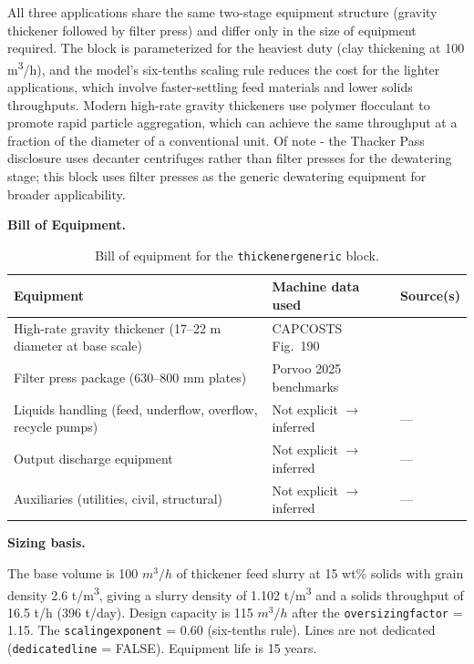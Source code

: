 \documentclass{article}
\renewcommand\_{\textunderscore\allowbreak}
\begin{document}
All three applications share the same two-stage equipment structure (gravity thickener followed by filter press) and differ only in the size of equipment required. The block is parameterized for the heaviest duty (clay thickening at 100 \si{m^3/h}), and the model's six-tenths scaling rule reduces the cost for the lighter applications, which involve faster-settling feed materials and lower solids throughputs. Modern high-rate gravity thickeners use polymer flocculant to promote rapid particle aggregation, which can achieve the same throughput at a fraction of the diameter of a conventional unit. Of note - the Thacker Pass disclosure uses decanter centrifuges rather than filter presses for the dewatering stage; this block uses filter presses as the generic dewatering equipment for broader applicability.

\medskip
\noindent\textbf{Bill of Equipment.}\quad

\begin{table}[h!]
\caption{Bill of equipment for the \texttt{thickener\_generic} block.}
\centering
\begin{tabular}{>{\raggedright\arraybackslash}p{5.2cm}
				>{\raggedright\arraybackslash}p{4cm}
				>{\raggedright\arraybackslash}p{4.5cm}}
\toprule
\textbf{Equipment} & \textbf{Machine data used} & \textbf{Source(s)} \\
\midrule
High-rate gravity thickener (17--22 m diameter at base scale) & CAPCOSTS Fig.~190 & \citet{mularCAPCOSTSHandbookEstimating1998} \\
Filter press package (630--800 mm plates) & Porvoo 2025 benchmarks & \citet{porvooIndustrialFilterPress2025} \\
Liquids handling (feed, underflow, overflow, recycle pumps) & Not explicit $\rightarrow$ inferred & --- \\
Output discharge equipment & Not explicit $\rightarrow$ inferred & --- \\
Auxiliaries (utilities, civil, structural) & Not explicit $\rightarrow$ inferred & --- \\
\bottomrule
\end{tabular}
\end{table}

\medskip
\noindent\textbf{Sizing basis.}\quad

The base volume is 100 $\si{m^3/h}$ of thickener feed slurry at 15 wt\% solids with grain density 2.6 \si{t/m^3}, giving a slurry density of 1.102 \si{t/m^3} and a solids throughput of 16.5 t/h (396 t/day). Design capacity is 115 $\si{m^3/h}$ after the \texttt{oversizing\_factor} = 1.15. The \texttt{scaling\_exponent} = 0.60 (six-tenths rule). Lines are not dedicated (\texttt{dedicated\_line} = FALSE). Equipment life is 15 years.
\end{document}
